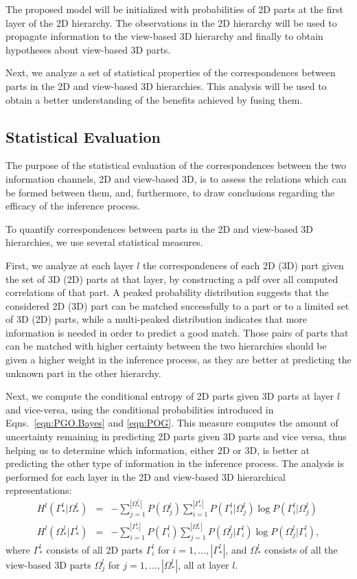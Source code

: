 \documentclass[runningheads]{llncs}
\begin{document}
The proposed model will be initialized with probabilities of 2D parts at the first layer of the 2D hierarchy. The observations in the 2D hierarchy will be used to propagate information to the view-based 3D hierarchy and finally to obtain hypotheses about view-based 3D parts. 

Next, we analyze a set of statistical properties of the correspondences between parts in the 2D and view-based 3D hierarchies. This analysis will be used to obtain a better understanding of the benefits achieved by fusing them.

\subsection{Statistical Evaluation}
\label{sec:statistical}

The purpose of the statistical evaluation of the correspondences between the two information channels, 2D and view-based 3D, is to assess the relations which can be formed between them, and, furthermore, to draw conclusions regarding the efficacy of the inference process. 

To quantify correspondences between parts in the 2D and view-based 3D hierarchies, we use several statistical measures.

First, we analyze at each layer $l$ the correspondences of each 2D (3D) part given the set of 3D (2D) parts at that layer, by constructing a pdf over all computed correlations of that part. A peaked probability distribution suggests that the considered 2D (3D) part can be matched successfully to a part or to a limited set of 3D (2D) parts, while a multi-peaked distribution indicates that more information is needed in order to predict a good match. Those pairs of parts that can be matched with higher certainty between the two hierarchies should be given a higher weight in the inference process, as they are better at predicting the unknown part in the other hierarchy.

Next, we compute the conditional entropy of 2D parts given 3D parts at layer $l$ and vice-versa, using the conditional probabilities introduced in Eqns.~\ref{eqn:PGO.Bayes} and \ref{eqn:POG}. This measure computes the amount of uncertainty remaining in predicting 2D parts given 3D parts and vice versa, thus helping us to determine which information, either 2D or 3D, is better at predicting the other type of information in the inference process. The analysis is performed for each layer in the 2D and view-based 3D hierarchical representations:
\begin{eqnarray}
 H^l(\Gamma_*^l|\Omega_*^l) &=& -\sum\limits_{j=1}^{|\Omega_*^l|}P({\Omega_j^l})\sum\limits_{i=1}^{|\Gamma_*^l|}P(\Gamma_i^l|\Omega_j^l)\log P(\Gamma_i^l|\Omega_j^l) \\
 H^l(\Omega_*^l|\Gamma_*^l) &=& -\sum\limits_{i=1}^{|\Gamma_*^l|}P({\Gamma_i^l})\sum\limits_{j=1}^{|\Omega_*^l|}P(\Omega_j^l|\Gamma_i^l)\log P(\Omega_j^l|\Gamma_i^l),
\end{eqnarray}
where $\Gamma_*^l$ consists of all 2D parts $\Gamma_i^l$ for $i=1,\ldots,|\Gamma_*^l|$, and $\Omega_*^l$ consists of all the view-based 3D parts $\Omega_j^l$ for $j=1,\ldots,|\Omega_*^l|$, all at layer $l$.
\end{document}
